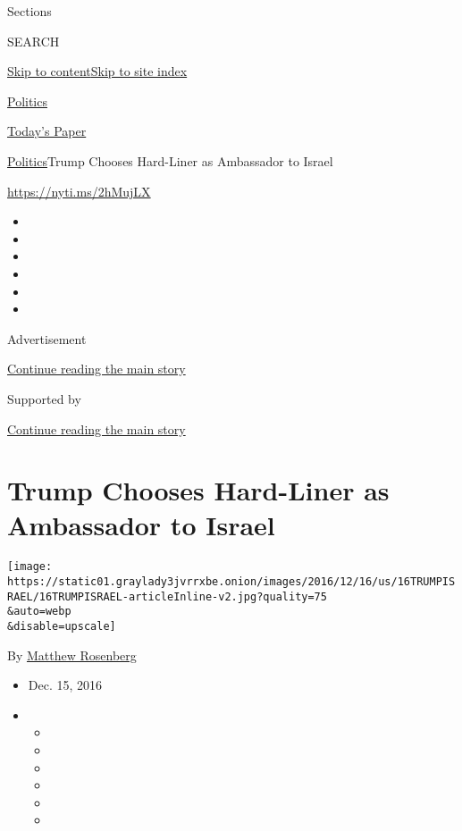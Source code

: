 Sections

SEARCH

\protect\hyperlink{site-content}{Skip to
content}\protect\hyperlink{site-index}{Skip to site index}

\href{https://www.nytimes3xbfgragh.onion/section/politics}{Politics}

\href{https://myaccount.nytimes3xbfgragh.onion/auth/login?response_type=cookie\&client_id=vi}{}

\href{https://www.nytimes3xbfgragh.onion/section/todayspaper}{Today's
Paper}

\href{/section/politics}{Politics}\textbar{}Trump Chooses Hard-Liner as
Ambassador to Israel

\url{https://nyti.ms/2hMujLX}

\begin{itemize}
\item
\item
\item
\item
\item
\item
\end{itemize}

Advertisement

\protect\hyperlink{after-top}{Continue reading the main story}

Supported by

\protect\hyperlink{after-sponsor}{Continue reading the main story}

\hypertarget{trump-chooses-hard-liner-as-ambassador-to-israel}{%
\section{Trump Chooses Hard-Liner as Ambassador to
Israel}\label{trump-chooses-hard-liner-as-ambassador-to-israel}}

\texttt{[image: https://static01.graylady3jvrrxbe.onion/images/2016/12/16/us/16TRUMPISRAEL/16TRUMPISRAEL-articleInline-v2.jpg?quality=75\\\&auto=webp\\\&disable=upscale]}

By \href{http://www.nytimes3xbfgragh.onion/by/matthew-rosenberg}{Matthew
Rosenberg}

\begin{itemize}
\item
  Dec. 15, 2016
\item
  \begin{itemize}
  \item
  \item
  \item
  \item
  \item
  \item
  \end{itemize}
\end{itemize}

